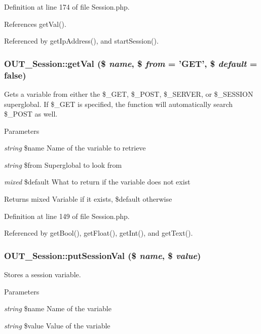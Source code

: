 Definition at line 174 of file Session.php.

References getVal().

Referenced by getIpAddress(), and startSession().\hypertarget{classOUT__Session_af2c29620bc267a3613ec1f15ead5c519}{
\subsubsection[{getVal}]{\setlength{\rightskip}{0pt plus 5cm}OUT\_\-Session::getVal (\$ {\em name}, \/  \$ {\em from} = {\ttfamily 'GET'}, \/  \$ {\em default} = {\ttfamily false})}}
\label{d6/d75/classOUT__Session_af2c29620bc267a3613ec1f15ead5c519}
Gets a variable from either the \$\_\-GET, \$\_\-POST, \$\_\-SERVER, or \$\_\-SESSION superglobal. If \$\_\-GET is specified, the function will automatically search \$\_\-POST as well.


\begin{DoxyParams}{Parameters}
\item[{\em string}]\$name Name of the variable to retrieve \item[{\em string}]\$from Superglobal to look from \item[{\em mixed}]\$default What to return if the variable does not exist\end{DoxyParams}
\begin{DoxyReturn}{Returns}
mixed Variable if it exists, \$default otherwise 
\end{DoxyReturn}


Definition at line 149 of file Session.php.

Referenced by getBool(), getFloat(), getInt(), and getText().\hypertarget{classOUT__Session_ae4af903f5997118f6036a4104ea20c3b}{
\subsubsection[{putSessionVal}]{\setlength{\rightskip}{0pt plus 5cm}OUT\_\-Session::putSessionVal (\$ {\em name}, \/  \$ {\em value})}}
\label{d6/d75/classOUT__Session_ae4af903f5997118f6036a4104ea20c3b}
Stores a session variable.


\begin{DoxyParams}{Parameters}
\item[{\em string}]\$name Name of the variable \item[{\em string}]\$value Value of the variable \end{DoxyParams}


